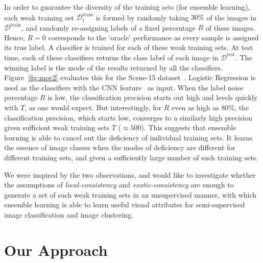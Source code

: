 \documentclass[preprint,12pt,3p]{elsarticle}
\def\dtrain{\mathcal{D}^\text{train}}
\begin{document}
In order to guarantee the diversity of the training sets (for ensemble
learning), each weak training set $\mathcal{D}^\text{train}_t$ is
formed by randomly taking $30\%$ of the images in $\dtrain$, and
randomly re-assigning labels of a fixed percentage $R$ of these
images. Hence, $R=0$ corresponds to the `oracle' performance as
every sample is assigned its true label.  A classifier is trained for
each of these weak training sets.  At test time, each of these
classifiers returns the class label of each image in
$\mathcal{D}^\text{test}$. The winning label is the mode of the
results returned by all the classifiers.  Figure~\ref{fig:mov2}
evaluates this for the Scene-15
dataset~\citep{lazebnik:cvpr06}. Logistic Regression is used as the
classifiers with the CNN feature~\citep{deep:bmvc14} as
input.  When the label noise percentage $R$ is low, the classification
precision starts out high and levels quickly with $T$, as one would
expect. But interestingly, for $R$ even as high as $80\%$, the
classification precision, which starts low, converges to a similarly
high precision given sufficient weak training sets $T$ ($\approx
500$).  This suggests that ensemble learning is able to cancel out the
deficiency of individual training sets. It learns the essence of image
classes when the modes of deficiency are different for different
training sets, and given a sufficiently large number of such training sets.

We were inspired by the two observations, and would like to
investigate whether the assumptions of \emph{local-consis\-tency} and
\emph{exotic-consistency} are enough to generate a set of such weak
training sets in an unsupervised manner, with which ensemble learning
is able to learn useful visual attributes for semi-supervised
image classification and image clustering.



\section{Our Approach}
\label{sec:approach}

\end{document}
